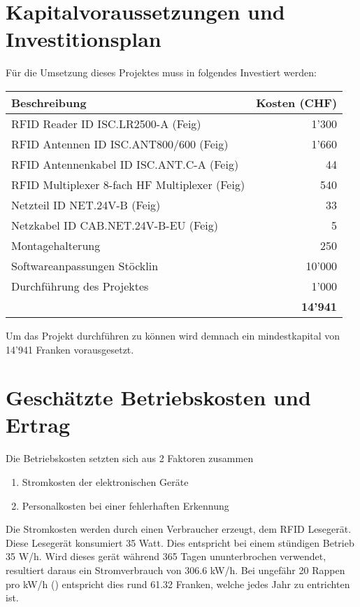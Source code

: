 \chapter{Kapitalvoraussetzungen und Investitionsplan}
Für die Umsetzung dieses Projektes muss in folgendes Investiert werden:

\vspace{1em}

\begin{tabularx}{\textwidth}{|X|r|}
	\hline
	\textbf{Beschreibung} & \textbf{Kosten (CHF)} \\
	\hline
	RFID Reader ID ISC.LR2500-A (Feig) & 1'300 \\
	\hline
	RFID Antennen ID ISC.ANT800/600 (Feig)& 1'660 \\
	\hline
	RFID Antennenkabel ID ISC.ANT.C-A (Feig) & 44 \\
	\hline
	RFID Multiplexer 8-fach HF Multiplexer (Feig) & 540 \\
	\hline
	Netzteil ID NET.24V-B (Feig) & 33 \\
	\hline
	Netzkabel ID CAB.NET.24V-B-EU (Feig) & 5 \\
	\hline
	Montagehalterung & 250 \\
	\hline
	Softwareanpassungen Stöcklin & 10'000 \\
	\hline
	Durchführung des Projektes & 1'000 \\
	\hline
	\hline
	 & \textbf{14'941} \\
	 \hline
\end{tabularx}

\vspace{1em}

Um das Projekt durchführen zu können wird demnach ein mindestkapital von 14'941 Franken vorausgesetzt.

\chapter{Geschätzte Betriebskosten und Ertrag}
Die Betriebskosten setzten sich aus 2 Faktoren zusammen
\begin{enumerate}
	\item Stromkosten der elektronischen Geräte
	\item Personalkosten bei einer fehlerhaften Erkennung
\end{enumerate}

Die Stromkosten werden durch einen Verbraucher erzeugt, dem RFID Lesegerät. Diese Lesegerät konsumiert 35 Watt. Dies entspricht bei einem stündigen Betrieb 35 W/h. Wird dieses gerät während 365 Tagen ununterbrochen verwendet, resultiert daraus ein Stromverbrauch von 306.6 kW/h. Bei ungefähr 20 Rappen pro kW/h (\cite{StromPreisAdmin2019}) entspricht dies rund 61.32 Franken, welche jedes Jahr zu entrichten ist.

